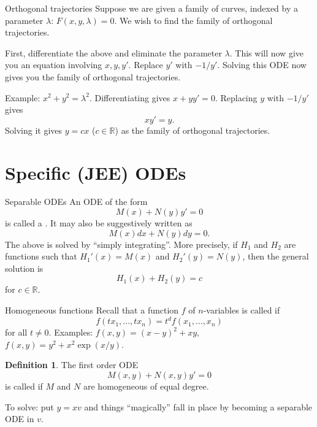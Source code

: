 \documentclass[dvipsnames, handout]{beamer}
\theoremstyle{definition}
\newtheorem{defn}[thm]{Definition}
\begin{document}
\begin{frame}{Orthogonal trajectories}
  Suppose we are given a family of curves, indexed by a parameter $\lambda$: $F(x, y, \lambda) = 0$. We wish to find the family of orthogonal trajectories. \pause

  First, differentiate the above and eliminate the parameter $\lambda$. \pause This will now give you an equation involving $x, y, y'$. \pause Replace $y'$ with $-1/y'$. \pause Solving this ODE now gives you the family of orthogonal trajectories. \pause

  Example: $x^{2} + y^{2} = \lambda^{2}$. \pause Differentiating gives $x + yy' = 0$. \pause Replacing $y$ with $-1/y'$ gives
  \begin{equation*} 
    xy' = y.
  \end{equation*} \pause
  Solving it gives $y = cx$ ($c \in \mathbb{R}$) as the family of orthogonal trajectories.
\end{frame}

\section{Specific (JEE) ODEs}

\begin{frame}{Separable ODEs}
  An ODE of the form
  \begin{equation*} 
    M(x) + N(y) y' = 0
  \end{equation*}
  is called a . \pause It may also be suggestively written as
  \begin{equation*} 
    M(x) dx + N(y) dy = 0.
  \end{equation*} \pause
  The above is solved by ``simply integrating''. \pause More precisely, if $H_{1}$ and $H_{2}$ are functions such that $H_{1}'(x) = M(x)$ and $H_{2}'(y) = N(y)$, \pause then the general solution is
  \begin{equation*} 
    H_{1}(x) + H_{2}(y) = c
  \end{equation*}
  for $c \in \mathbb{R}$.
\end{frame}
\begin{frame}{Homogeneous functions}
  Recall that a function $f$ of $n$-variables is called  if \pause
  \begin{equation*} 
    f(tx_{1}, \ldots, tx_{n}) = t^{d} f(x_{1}, \ldots, x_{n})
  \end{equation*}
  for all $t \neq 0$. \pause Examples: $f(x, y) = (x - y)^{2} + xy$, \pause $f(x, y) = y^{2} + x^{2} \exp(x/y)$. \pause

  \begin{defn}
    The first order ODE
    \begin{equation*} 
      M(x, y) + N(x, y) y' = 0
    \end{equation*}
    is called  if $M$ and $N$ are homogeneous of equal degree.
  \end{defn} \pause

  To solve: put $y = xv$ and things ``magically'' fall in place by becoming a separable ODE in $v$.
\end{frame}
\end{document}
